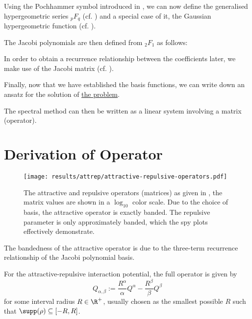 Using the Pochhammer symbol introduced in , we can now define the generalised hypergeometric series ${}_pF_q$ (cf. ) and a special case of it, the Gaussian hypergeometric function (cf. ).



The Jacobi polynomials are then defined from ${}_2F_1$ as follows:




In order to obtain a recurrence relationship between the coefficients later, we make use of the Jacobi matrix (cf. ).


Finally, now that we have established the basis functions, we can write down an ansatz for the solution of \hyperref[sec:the-problem]{the problem}.


The spectral method can then be written as a linear system involving a matrix (operator).



\section{Derivation of Operator}


\begin{figure}[H]
  \centering
  \label{fig:attractive-repulsive}
  \texttt{[image: results/attrep/attractive-repulsive-operators.pdf]}
  \caption[Attractive and repulsive operators.]{The attractive and repulsive operators (matrices) as given in , the matrix values are shown in a $\log_{10}$ color scale. Due to the choice of basis, the attractive operator is exactly banded. The repulsive parameter is only approximately banded, which the spy plots effectively demonstrate.}
\end{figure}

The bandedness of the attractive operator is due to the three-term recurrence relationship of the Jacobi polynomial basis.

For the attractive-repulsive interaction potential, the full operator is given by
\begin{equation}
  Q_{\alpha, \beta} := \frac{R^\alpha}{\alpha} Q^\alpha - \frac{R^\beta}{\beta} Q^\beta
  \label{eq:full-attrep-operator}
\end{equation}
for some interval radius $R \in \R^+$, usually chosen as the smallest possible $R$ such that $\supp(\rho) \subseteq [-R, R]$.

